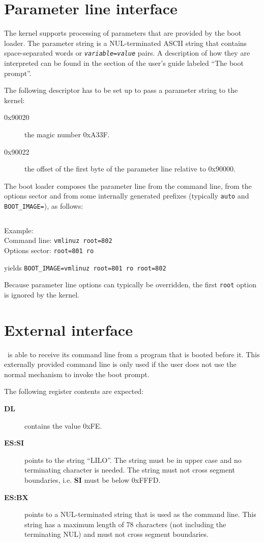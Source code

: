 \section{Parameter line interface}

The kernel supports processing of parameters that are
provided by the boot loader. The parameter string is a NUL-terminated
ASCII string that contains space-separated words or
{\tt {\it variable\/}={\it value\/}} pairs. A description of how they are
interpreted can be found in the section of the user's guide labeled
``The boot prompt''.

The following descriptor has to be set up to pass a parameter string to
the kernel:

\begin{description}
  \item[0x90020] the magic number 0xA33F.
  \item[0x90022] the offset of the first byte of the parameter line relative
    to 0x90000.
\end{description}

The boot loader composes the parameter line from the command line, from
the options sector and from some internally generated prefixes (typically
\verb"auto" and \verb"BOOT_IMAGE="), as follows:

$$
  
$$

Example: \\
Command line: \verb"vmlinuz root=802"\\
Options sector: \verb"root=801 ro"

yields \verb"BOOT_IMAGE=vmlinuz root=801 ro root=802"

Because parameter line options can typically be overridden, the first
\verb"root" option is ignored by the kernel.


\section{External interface}

\LILO\ is able to receive its command line from a program that is booted
before it. This externally provided command line is only used if the
user does not use the normal mechanism to invoke the boot prompt.

The following register contents are expected:

\begin{description}
  \item[\bf DL] contains the value 0xFE.
  \item[\bf ES:SI] points to the string ``LILO''. The string must be in
    upper case and no terminating character is needed. The string must not
    cross segment boundaries, i.e. {\bf SI} must be below 0xFFFD.
  \item[\bf ES:BX] points to a NUL-terminated string that is used as the
    command line. This string has a maximum length of 78 characters (not
    including the terminating NUL) and must not cross segment boundaries.
\end{description}

